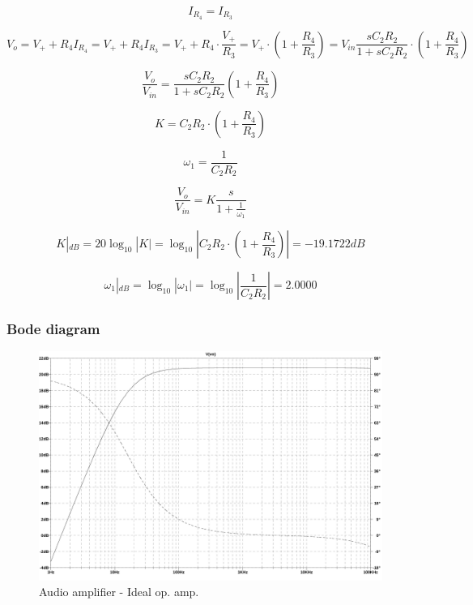 \documentclass[10pt,a4paper]{article}
\begin{document}
\begin{equation} \label{eq:I_R4}
I_{R_4} = I_{R_3}
\end{equation}

\begin{equation} \label{eq:V_o}
V_o = V_+ + R_4I_{R_4} = V_+ + R_4 I_{R_3} = V_+ + R_4 \cdot \frac{V_+}{R_3} =
V_+ \cdot \left(1 + \frac{R_4}{R_3} \right) =
V_{in}\frac{sC_2R_2}{1+sC_2R_2} \cdot \left(1 + \frac{R_4}{R_3} \right)
\end{equation}

\begin{equation} \label{eq:TF}
\frac{V_o}{V_{in}} = \frac{sC_2R_2}{1+sC_2R_2}\left(1+\frac{R_4}{R_3}\right)
\end{equation}

\begin{equation} \label{eq:K}
K = C_2R_2 \cdot \left(1+\frac{R_4}{R_3}\right)
\end{equation}

\begin{equation} \label{eq:omega_1}
 \omega_1 = \frac{1}{C_2R_2}
\end{equation}

\begin{equation} \label{eq:TFBode}
\frac{V_o}{V_{in}} = K \frac{s}{1+\frac{1}{\omega_1}}
\end{equation}

\begin{equation} \label{eq:KdB}
 K|_{dB} = 20\log_{10}|K| = \log_{10}\left|C_2R_2 \cdot \left(1+\frac{R_4}{R_3}\right)\right| = -19.1722 dB
\end{equation}

\begin{equation} \label{eq:omega_1dB}
\omega_1|_{dB} = \log_{10} |\omega_1| = \log_{10} \left| \frac{1}{C_2R_2} \right|= 2.0000
\end{equation}

\subsubsection{Bode diagram}
\begin{figure}[h]
  \centering
  \includegraphics[width=14cm]{graph/1d1.jpg}
  \caption{Audio amplifier - Ideal op. amp.}
  \label{1d1graph}
\end{figure}
\end{document}
